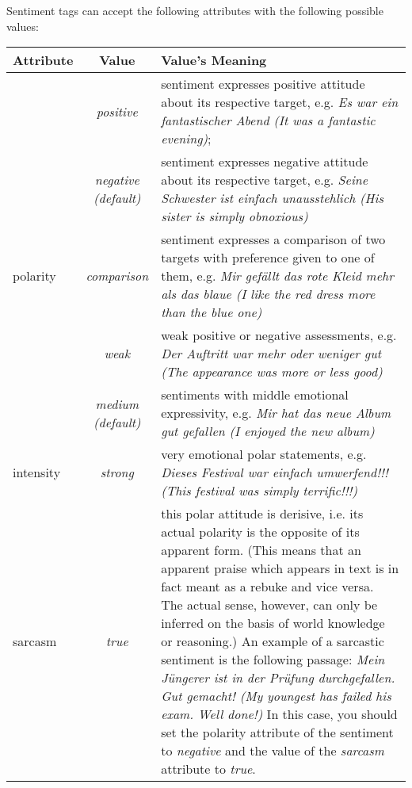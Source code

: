\documentclass[11pt,a4paper]{article}
\newlength\clmnwidth
\begin{document}
Sentiment tags can accept the following attributes with the following
possible values:
\begin{center}
  \begin{tabular}{|l|c|p{\clmnwidth}|}\hline
    Attribute & Value & Value's Meaning\\\hline

    & \textit{positive} & sentiment expresses positive attitude about
    its respective target, e.g. \textit{Es war ein fantastischer Abend
      (It was a fantastic evening)};\\\cline{2-3}

    & \textit{negative\newline(default)} & sentiment expresses
    negative attitude about its respective target, e.g. \textit{Seine
      Schwester ist einfach unausstehlich (His sister is simply
      obnoxious)}\\\cline{2-3}

    \multirow{-3}{*}{polarity} & \textit{comparison} & sentiment
    expresses a comparison of two targets with preference given to one
    of them, e.g. \textit{Mir gef\"allt das rote Kleid mehr als das
      blaue (I like the red dress more than the blue one)}\\\hline


    & \textit{weak} & weak positive or
    negative assessments, e.g. \textit{Der Auftritt war mehr oder
      weniger gut (The appearance was more or less good)}\\\cline{2-3}

    & \textit{medium\newline(default)} & sentiments with middle
    emotional expressivity, e.g. \textit{Mir hat das neue Album gut
      gefallen (I enjoyed the new album)}\\\cline{2-3}

    \multirow{-3}{*}{intensity} & \textit{strong} & very emotional
    polar statements, e.g. \textit{Dieses Festival war einfach
      umwerfend!!! (This festival was simply terrific!!!)}\\\hline

    \multirow{2}{*}{sarcasm} & \textit{true} & this polar attitude is
    derisive, i.e. its actual polarity is the opposite of its apparent
    form. (This means that an apparent praise which appears in text is
    in fact meant as a rebuke and vice versa. The actual sense,
    however, can only be inferred on the basis of world knowledge or
    reasoning.)  An example of a sarcastic sentiment is the following
    passage: \textit{Mein J\"ungerer ist in der Pr\"ufung
      durchgefallen.  Gut gemacht! (My youngest has failed his exam.
      Well done!)}  In this case, you should set the polarity attribute
    of the sentiment to \textit{negative} and the value of the
    \textit{sarcasm} attribute to \textit{true}.\\\cline{2-3}


\end{tabular}
\end{center}
\end{document}
